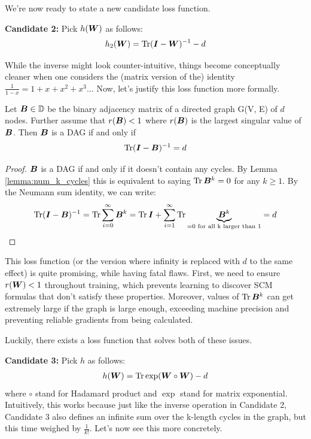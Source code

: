 \documentclass[11pt,a4paper]{article}
\begin{document}
We're now ready to state a new candidate loss function. 

\textbf{Candidate 2:} Pick $h({\bm{W}})$ as follows:
\begin{align}
    h_2({\bm{W}}) = \operatorname{Tr} ({\bm{I}} - {\bm{W}})^{-1} - d
\end{align}

While the inverse might look counter-intuitive, things become conceptually cleaner when one considers the (matrix version of the) identity $\frac{1}{1-x} = 1 + x + x^2 + x^3 \dots$ Now, let's justify this loss function more formally. 
\begin{lemma}
     Let ${\bm{B}} \in \mathbb{D}$ be the binary adjacency matrix of a directed graph G(V, E) of $d$ nodes. Further assume that $r({\bm{B}}) < 1$ where $r({\bm{B}})$ is the largest singular value of ${\bm{B}}$. Then ${\bm{B}}$ is a DAG if and only if 
     \begin{align}
         \operatorname{Tr} ({\bm{I}} - {\bm{B}})^{-1} = d
     \end{align}
\end{lemma}
\begin{proof}
    ${\bm{B}}$ is a DAG if and only if it doesn't contain any cycles. By Lemma \ref{lemma:num_k_cycles} this is equivalent to saying $\operatorname{Tr} {\bm{B}}^k = 0$ for any $k \geq 1$. By the Neumann sum identity, we can write:
    \begin{align}
        \operatorname{Tr} ({\bm{I}} - {\bm{B}})^{-1} = \operatorname{Tr} \sum_{i=0}^{\infty}{\bm{B}}^k = \operatorname{Tr} {\bm{I}} + \sum_{i=1}^{\infty}\operatorname{Tr} \underbrace{{\bm{B}}^k}_{\text{=0 for all k larger than 1}} = d
    \end{align}
\end{proof}

This loss function (or the version where infinity is replaced with $d$ to the same effect) is quite promising, while having fatal flaws. First, we need to ensure $r({\bm{W}}) < 1$ throughout training, which prevents learning to discover SCM formulas that don't satisfy these properties. Moreover, values of $\operatorname{Tr} {\bm{B}}^k$ can get extremely large if the graph is large enough, exceeding machine precision and preventing reliable gradients from being calculated. 

Luckily, there exists a loss function that solves both of these issues. 

\textbf{Candidate 3: } Pick $h$ as follows:
\begin{align}
    h({\bm{W}}) = \operatorname{Tr} \exp ({\bm{W}} \circ  {\bm{W}}) - d
\end{align}
where $\circ$ stand for Hadamard product and $\exp$ stand for matrix exponential. 
Intuitively, this works because just like the inverse operation in Candidate 2, Candidate 3 also defines an infinite sum over the k-length cycles in the graph, but this time weighed by $\frac{1}{k!}$. Let's now see this more concretely. 
\end{document}
